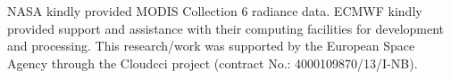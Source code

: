 \begin{acknowledgements}
NASA kindly provided MODIS Collection 6 radiance data. ECMWF kindly provided support and assistance with their computing facilities for development and processing.
This research/work was supported by the European Space Agency through the Cloud\textunderscore cci project (contract No.: 4000109870/13/I-NB).

\end{acknowledgements}

